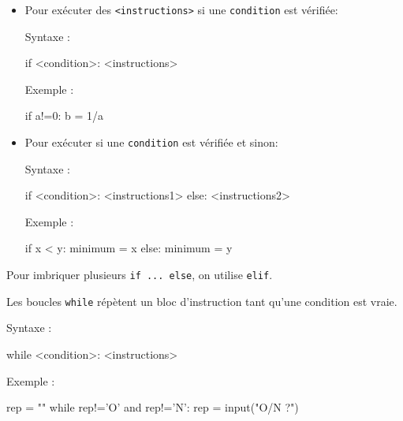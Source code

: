 \documentclass[11pt,a4paper]{article}
\begin{document}
\begin{tcolorbox}[left=0cm,title=\bf{\faPython \; Instructions conditionnelles},colbacktitle=cfond]
	\begin{itemize}
		\item[\textbullet] Pour exécuter des {\tt <instructions>} si une {\tt condition} est vérifiée:
	\setlength{\multicolsep}{0pt}
	\begin{multicols}{2}
	Syntaxe :
	\begin{python} 
if <condition>:
	<instructions>
	\end{python} 
	Exemple : 
	\begin{python} 
if a!=0:
	b = 1/a
	\end{python} 
\end{multicols}
\item[\textbullet] Pour exécuter {\tt <instructions1>} si une {\tt condition} est vérifiée et {\tt <instructions2>} sinon:
\begin{multicols}{2}
	Syntaxe :
	\begin{python} 
if <condition>:
	<instructions1>
else:
	<instructions2>
	\end{python} 
	Exemple : 
	\begin{python} 
if x < y:
	minimum = x
else:
	minimum = y
	\end{python} 
\end{multicols}
\end{itemize}
Pour imbriquer plusieurs {\tt if ... else}, on utilise {\tt elif}.
\end{tcolorbox}

\begin{tcolorbox}[left=0cm,title=\bf{\faPython \; Boucles {\tt while}},colbacktitle=cfond]
	Les boucles {\tt while} répètent un bloc d'instruction tant qu'une condition est vraie.
	\setlength{\multicolsep}{0pt}
	\begin{multicols}{2}
		Syntaxe :
		\begin{python} 
while <condition>:
	<instructions>
		\end{python} 
		Exemple : 
		\begin{python}
rep = "" 
while rep!='O' and rep!='N':
	rep = input("O/N ?")
		\end{python}
	\end{multicols}
\end{tcolorbox}
\end{document}
